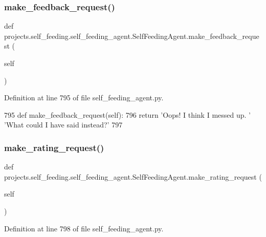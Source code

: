 \subsubsection{\texorpdfstring{make\+\_\+feedback\+\_\+request()}{make\_feedback\_request()}}
{\footnotesize\ttfamily def projects.\+self\+\_\+feeding.\+self\+\_\+feeding\+\_\+agent.\+Self\+Feeding\+Agent.\+make\+\_\+feedback\+\_\+request (\begin{DoxyParamCaption}\item[{}]{self }\end{DoxyParamCaption})}



Definition at line 795 of file self\+\_\+feeding\+\_\+agent.\+py.


\begin{DoxyCode}
795     \textcolor{keyword}{def }make\_feedback\_request(self):
796         \textcolor{keywordflow}{return} \textcolor{stringliteral}{'Oops! I think I messed up. '} \textcolor{stringliteral}{'What could I have said instead?'}
797 
\end{DoxyCode}
\mbox{\label{classprojects_1_1self__feeding_1_1self__feeding__agent_1_1SelfFeedingAgent_aa97b64df930c600bd7be1b69779849e7}} 
\subsubsection{\texorpdfstring{make\+\_\+rating\+\_\+request()}{make\_rating\_request()}}
{\footnotesize\ttfamily def projects.\+self\+\_\+feeding.\+self\+\_\+feeding\+\_\+agent.\+Self\+Feeding\+Agent.\+make\+\_\+rating\+\_\+request (\begin{DoxyParamCaption}\item[{}]{self }\end{DoxyParamCaption})}



Definition at line 798 of file self\+\_\+feeding\+\_\+agent.\+py.


